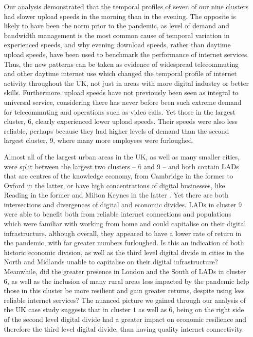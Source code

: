 \documentclass[]{interact}
\theoremstyle{plain}%
\theoremstyle{definition}
\theoremstyle{remark}
\begin{document}
Our analysis demonstrated that the temporal profiles of seven of our
nine clusters had slower upload speeds in the morning than in the
evening. The opposite is likely to have been the norm prior to the
pandemic, as level of demand and bandwidth management is the most common
cause of temporal variation in experienced speeds, and why evening
download speeds, rather than daytime upload speeds, have been used to
benchmark the performance of internet services. Thus, the new patterns
can be taken as evidence of widespread telecommuting and other daytime
internet use which changed the temporal profile of internet activity
throughout the UK, not just in areas with more digital industry or
better skills. Furthermore, upload speeds have not previously been seen
as integral to universal service, considering there has never before
been such extreme demand for telecommuting and operations such as video
calls. Yet those in the largest cluster, \(6\), clearly experienced
lower upload speeds. Their speeds were also less reliable, perhaps
because they had higher levels of demand than the second largest
cluster, \(9\), where many more employees were furloughed.

Almost all of the largest urban areas in the UK, as well as many smaller
cities, were split between the largest two clusters -- \(6\) and \(9\)
-- and both contain LADs that are centres of the knowledge economy, from
Cambridge in the former to Oxford in the latter, or have high
concentrations of digital businesses, like Reading in the former and
Milton Keynes in the latter \citep{technation2017}. Yet there are both
intersections and divergences of digital and economic divides. LADs in
cluster \(9\) were able to benefit both from reliable internet
connections and populations which were familiar with working from home
and could capitalise on their digital infrastructure, although overall,
they appeared to have a lower rate of return in the pandemic, with far
greater numbers furloughed. Is this an indication of both historic
economic division, as well as the third level digital divide in cities
in the North and Midlands unable to capitalise on their digital
infrastructure? Meanwhile, did the greater presence in London and the
South of LADs in cluster \(6\), as well as the inclusion of many rural
areas less impacted by the pandemic help those in this cluster be more
resilient and gain greater returns, despite using less reliable internet
services? The nuanced picture we gained through our analysis of the UK
case study suggests that in cluster \(1\) as well as \(6\), being on the
right side of the second level digital divide had a greater impact on
economic resilience and therefore the third level digital divide, than
having quality internet connectivity.
\end{document}
